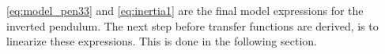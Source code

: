 %
\autoref{eq:model_pen33} and \autoref{eq:inertia1} are the final model expressions for the inverted pendulum. The next step before transfer functions are derived, is to linearize these expressions. This is done in the following section.
\vspace{1 cm}
